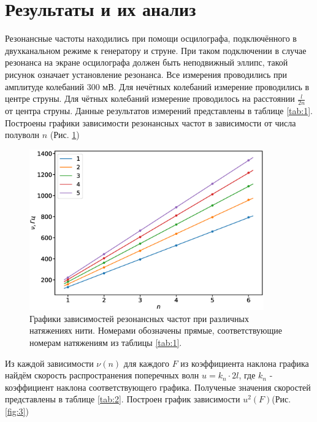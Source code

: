 \documentclass[12pt]{article}
\begin{document}
\section{Результаты и их анализ}
Резонансные частоты находились при помощи осцилографа, подключённого в двухканальном режиме к генератору и струне. При таком подключении в 
случае резонанса на экране осцилографа должен быть неподвижный эллипс, такой рисунок означает установление резонанса. Все измерения проводились 
при амплитуде колебаний $300$ мВ. Для нечётных колебаний измерение проводились в центре струны. Для чётных колебаний измерение проводилось на 
расстоянии $\frac{l}{2n}$ от центра струны. Данные результатов измерений представлены в таблице \ref{tab:1}.
Построены графики зависимости резонансных частот в зависимости от числа полуволн $n$ (Рис. \ref{fig:2})
\begin{figure}[H]
    \begin{center}
        \includegraphics[width=0.9\textwidth]{gr0.eps}
    \end{center}
    \caption{Графики зависимостей резонансных частот при различных натяжениях нити. Номерами обозначены прямые, соответствующие номерам натяжениям
        из таблицы \ref{tab:1}.}
    \label{fig:2}
\end{figure}
Из каждой зависимости $\nu(n)$ для каждого $F$ из коэффициента наклона графика найдём скорость распространения поперечных волн $u = k_n\cdot2l$, 
где $k_n$ - коэффициент наклона соответствующего графика. Полученые значения скоростей представлены в таблице \ref{tab:2}.
Построен график зависимости $u^2(F)$(Рис. \ref{fig:3}) 
\end{document}
